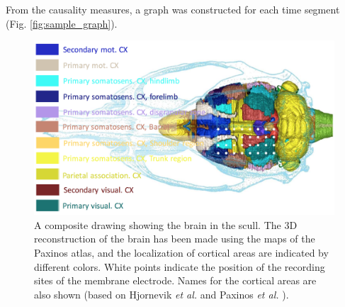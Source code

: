 \documentclass[journal,12pt,onecolumn,draftclsnofoot]{IEEEtran}  %
\begin{document}
From the causality measures, a graph was constructed for each time segment (Fig. \ref{fig:sample_graph}). 





\begin{figure}[!h]
  \centering
  \includegraphics[width=0.95\linewidth]{figures/rat_brain_schematic.png}
  \caption{A composite drawing showing the brain in the scull. The 3D reconstruction of the brain has been made using the maps of the Paxinos atlas, and the localization of cortical areas are indicated by different colors. White points indicate the position of the recording sites of the membrane electrode. Names for the cortical areas are also shown (based on Hjornevik \textit{et al.} and Paxinos \textit{et al.} \cite{hjornevik2007} \cite{paxinos2009}).}
  \label{fig:rat_brain_schematic}
\end{figure}
\end{document}
